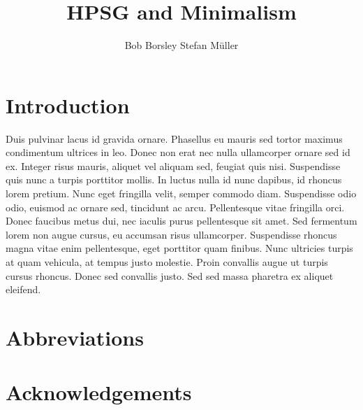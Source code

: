 \documentclass[output=paper]{langsci/langscibook}
\author{%
	Bob Borsley\affiliation{University of Essex}%
	\lastand Stefan Müller\affiliation{Humboldt-Universität zu Berlin}%
}
\title{HPSG and Minimalism}
\begin{document}
\section{Introduction} 
Duis pulvinar lacus id gravida ornare. Phasellus eu mauris sed tortor maximus condimentum ultrices in leo. Donec non erat nec nulla ullamcorper ornare sed id ex. Integer risus mauris, aliquet vel aliquam sed, feugiat quis nisi. Suspendisse quis nunc a turpis porttitor mollis. In luctus nulla id nunc dapibus, id rhoncus lorem pretium. Nunc eget fringilla velit, semper commodo diam. Suspendisse odio odio, euismod ac ornare sed, tincidunt ac arcu. Pellentesque vitae fringilla orci. Donec faucibus metus dui, nec iaculis purus pellentesque sit amet. Sed fermentum lorem non augue cursus, eu accumsan risus ullamcorper. Suspendisse rhoncus magna vitae enim pellentesque, eget porttitor quam finibus. Nunc ultricies turpis at quam vehicula, at tempus justo molestie. Proin convallis augue ut turpis cursus rhoncus. Donec sed convallis justo. Sed sed massa pharetra ex aliquet eleifend. 

 
\section*{Abbreviations}
\section*{Acknowledgements}

\printbibliography[heading=subbibliography,notkeyword=this] 
\end{document}
